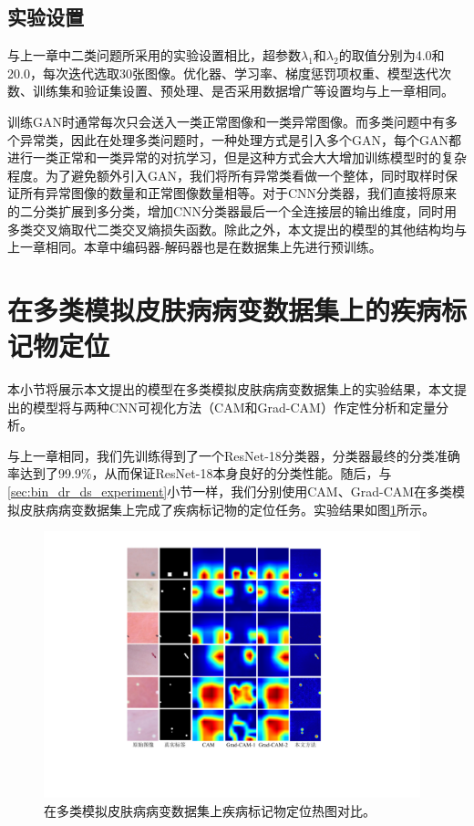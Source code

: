 \subsection{实验设置}\label{sec:multi_classes_experiment_setting}
与上一章中二类问题所采用的实验设置相比，超参数$\lambda_{1}$和$\lambda_{2}$的取值分别为4.0和20.0，每次迭代选取30张图像。优化器、学习率、梯度惩罚项权重、模型迭代次数、训练集和验证集设置、预处理、是否采用数据增广等设置均与上一章相同。

训练GAN时通常每次只会送入一类正常图像和一类异常图像。而多类问题中有多个异常类，因此在处理多类问题时，一种处理方式是引入多个GAN，每个GAN都进行一类正常和一类异常的对抗学习，但是这种方式会大大增加训练模型时的复杂程度。为了避免额外引入GAN，我们将所有异常类看做一个整体，同时取样时保证所有异常图像的数量和正常图像数量相等。对于CNN分类器，我们直接将原来的二分类扩展到多分类，增加CNN分类器最后一个全连接层的输出维度，同时用多类交叉熵取代二类交叉熵损失函数。除此之外，本文提出的模型的其他结构均与上一章相同。本章中编码器-解码器也是在数据集上先进行预训练。
\section{在多类模拟皮肤病病变数据集上的疾病标记物定位}\label{sec:multi_classes_experiments_res}
本小节将展示本文提出的模型在多类模拟皮肤病病变数据集上的实验结果，本文提出的模型将与两种CNN可视化方法（CAM和Grad-CAM）作定性分析和定量分析。

与上一章相同，我们先训练得到了一个ResNet-18分类器，分类器最终的分类准确率达到了99.9\%，从而保证ResNet-18本身良好的分类性能。随后，与\ref{sec:bin_dr_ds_experiment}小节一样，我们分别使用CAM、Grad-CAM在多类模拟皮肤病病变数据集上完成了疾病标记物的定位任务。实验结果如图\ref{fig:multi_simulated_skin_res}所示。
\begin{figure}[h]
	\centering
	\includegraphics[width=0.975\textwidth]{figure/multi_simulated_skin_res.pdf}
	\caption[在多类模拟皮肤病病变数据集上疾病标记物定位热图对比]{在多类模拟皮肤病病变数据集上疾病标记物定位热图对比。}
	\label{fig:multi_simulated_skin_res}
\end{figure}

